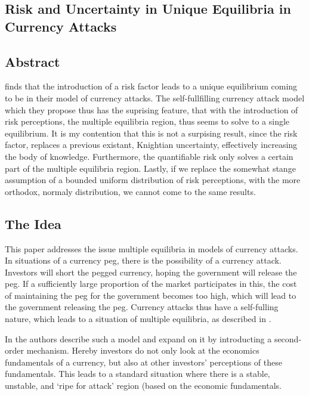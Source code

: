 \documentclass[a4paper]{report}
\begin{document}
\begin{refsection}
\chapter{Risk and Uncertainty in Unique Equilibria in Currency Attacks}
\label{uncertainty}
\section*{Abstract}
\textcite{morris1998unique} finds that the introduction of a risk factor leads to a unique equilibrium coming to be in their model of currency attacks.
The self-fullfilling currency attack model which they propose thus has the suprising feature,
that with the introduction of risk perceptions, the multiple equilibria region, thus seems to solve to a single equilibrium.
It is my contention that this is not a surpising result, since the risk factor, replaces a previous existant, Knightian uncertainty, effectively increasing the body of knowledge.
Furthermore, the quantifiable risk only solves a certain part of the multiple equilibria region.
Lastly, if we replace the somewhat stange assumption of a bounded uniform distribution of risk perceptions,
with the more orthodox, normaly distribution, we cannot come to the same results.

\section{The Idea}
This paper addresses the issue multiple equilibria in models of currency attacks.
In situations of a currency peg, there is the possibility of a currency attack.
Investors will short the pegged currency, hoping the government will release the peg.
If a sufficiently large proportion of the market participates in this,
the cost of maintaining the peg for the government becomes too high,
which will lead to the government releasing the peg.
Currency attacks thus have a self-fulling nature,
which leads to a situation of multiple equilibria,
as described in \textcite{obstfeld1986rational,obstfeld1995logic,obstfeld1996models}.

In \textcite{morris1998unique} the authors describe such a model
and expand on it by introducting a second-order mechanism.
Hereby investors do not only look at the economics fundamentals of a currency,
but also at other investors' perceptions of these fundamentals.
This leads to a standard situation where there is a stable, unstable, and `ripe for attack' region (based on the economic fundamentals.


\end{refsection}
\end{document}
